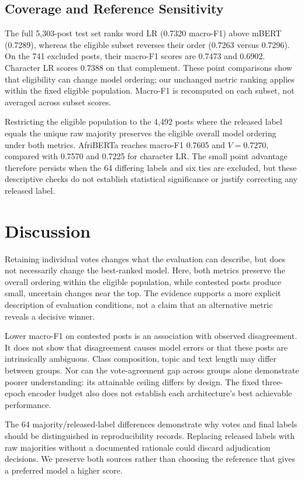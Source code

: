 \documentclass[conference]{IEEEtran}
\begin{document}
\subsection{Coverage and Reference Sensitivity}
The full 5,303-post test set ranks word LR (0.7320 macro-F1) above
mBERT (0.7289), whereas the eligible subset reverses their order
(0.7263 versus 0.7296). On the 741 excluded posts, their macro-F1 scores are
0.7473 and 0.6902. Character LR scores 0.7388 on that complement.
These point comparisons show that eligibility can change model ordering;
our unchanged metric ranking applies within the fixed eligible population.
Macro-F1 is recomputed on each subset, not averaged across subset scores.

Restricting the eligible population to the 4,492 posts where the released
label equals the unique raw majority preserves the eligible overall model
ordering under both metrics. AfriBERTa reaches macro-F1 0.7605 and
$V=0.7270$, compared with 0.7570 and 0.7225 for character LR.
The small point advantage therefore persists when the 64 differing labels
and six ties are excluded, but these descriptive checks do not establish
statistical significance or justify correcting any released label.

\section{Discussion}
Retaining individual votes changes what the evaluation can describe, but
does not necessarily change the best-ranked model. Here, both metrics preserve
the overall ordering within the eligible population, while contested posts produce small, uncertain changes
near the top. The evidence supports a more explicit description of evaluation
conditions, not a claim that an alternative metric reveals a decisive winner.

Lower macro-F1 on contested posts is an association with observed disagreement.
It does not show that disagreement causes model errors or that these posts
are intrinsically ambiguous. Class composition, topic and text length may
differ between groups. Nor can the vote-agreement gap across groups alone
demonstrate poorer understanding: its attainable ceiling differs by design.
The fixed three-epoch encoder budget also does not establish each
architecture's best achievable performance.

The 64 majority/released-label differences demonstrate why votes and final
labels should be distinguished in reproducibility records. Replacing released
labels with raw majorities without a documented rationale could discard
adjudication decisions. We preserve both sources rather than choosing the
reference that gives a preferred model a higher score.
\end{document}
